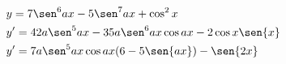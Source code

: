 \begin{ex}
\begin{align}
&y=7\sen^6{ax}-5\sen^7{ax}+\cos^2{x}\nonumber\\
&y'=42a\sen^5{ax}-35a\sen^6{ax}\cos{ax}-2\cos{x}\sen{x}\nonumber\\
&y'=7a\sen^5{ax}\cos{ax}(6-5\sen{ax})-\sen{2x}\nonumber
\end{align}
\end{ex}